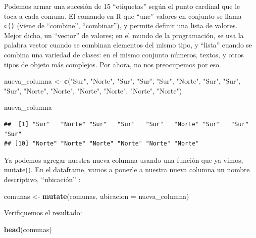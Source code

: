 \documentclass[spanish,]{book}
\newenvironment{Shaded}{\begin{snugshade}}{\end{snugshade}}
\newcommand{\DataTypeTok}[1]{\textcolor[rgb]{0.13,0.29,0.53}{#1}}
\newcommand{\KeywordTok}[1]{\textcolor[rgb]{0.13,0.29,0.53}{\textbf{#1}}}
\newcommand{\NormalTok}[1]{#1}
\newcommand{\StringTok}[1]{\textcolor[rgb]{0.31,0.60,0.02}{#1}}
\begin{document}
Podemos armar una sucesión de 15 ``etiquetas'' según el punto cardinal que le toca a cada comuna. El comando en R que ``une'' valores en conjunto se llama \texttt{c()} (viene de ``combine'', ``combinar''), y permite definir una lista de valores. Mejor dicho, un ``vector'' de valores; en el mundo de la programación, se usa la palabra vector cuando se combinan elementos del mismo tipo, y ``lista'' cuando se combina una variedad de clases: en el mismo conjunto números, textos, y otros tipos de objeto más complejos. Por ahora, no nos preocupemos por eso.

\begin{Shaded}
\begin{Highlighting}[]
\NormalTok{nueva_columna <-}\StringTok{ }\KeywordTok{c}\NormalTok{(}\StringTok{"Sur"}\NormalTok{, }\StringTok{"Norte"}\NormalTok{, }\StringTok{"Sur"}\NormalTok{, }\StringTok{"Sur"}\NormalTok{, }\StringTok{"Sur"}\NormalTok{, }\StringTok{"Norte"}\NormalTok{, }\StringTok{"Sur"}\NormalTok{, }\StringTok{"Sur"}\NormalTok{, }
                   \StringTok{"Sur"}\NormalTok{, }\StringTok{"Norte"}\NormalTok{, }\StringTok{"Norte"}\NormalTok{, }\StringTok{"Norte"}\NormalTok{, }\StringTok{"Norte"}\NormalTok{, }\StringTok{"Norte"}\NormalTok{, }\StringTok{"Norte"}\NormalTok{)}

\NormalTok{nueva_columna}
\end{Highlighting}
\end{Shaded}

\begin{verbatim}
##  [1] "Sur"   "Norte" "Sur"   "Sur"   "Sur"   "Norte" "Sur"   "Sur"   "Sur"  
## [10] "Norte" "Norte" "Norte" "Norte" "Norte" "Norte"
\end{verbatim}

Ya podemos agregar nuestra nueva columna usando una función que ya vimos, mutate(). En el dataframe, vamos a ponerle a nuestra nueva columna un nombre descriptivo, ``ubicación'' :

\begin{Shaded}
\begin{Highlighting}[]
\NormalTok{comunas <-}\StringTok{ }\KeywordTok{mutate}\NormalTok{(comunas, }\DataTypeTok{ubicacion =}\NormalTok{ nueva_columna)}
\end{Highlighting}
\end{Shaded}

Verifiquemos el resultado:

\begin{Shaded}
\begin{Highlighting}[]
\KeywordTok{head}\NormalTok{(comunas)}
\end{Highlighting}
\end{Shaded}
\end{document}
